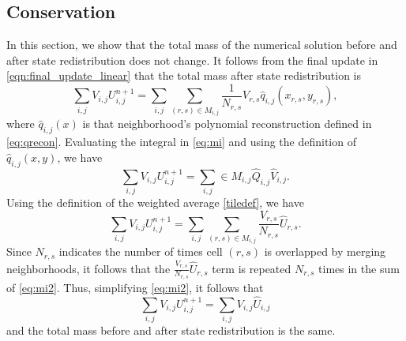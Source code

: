 \subsection{Conservation}\label{sec:cons}
In this section, we show that the total mass of the numerical solution before and after state redistribution does not change.  It follows from the final update in \eqref{eqn:final_update_linear} that the total mass after state redistribution is
\begin{equation}\label{eq:mi}
\sum_{i,j} V_{i,j} U^{n+1}_{i,j} = \sum_{i,j} \sum_{(r,s) \in
M_{i,j}}\frac{1}{N_{r,s}} V_{r,s} \widehat q_{i,j}(x_{r,s},y_{r,s}) ,
\end{equation}
where $\widehat q_{i,j}(x)$ is that neighborhood's polynomial reconstruction defined in \eqref{eq:qrecon}.
Evaluating the integral in \eqref{eq:mi} and using the definition
of $\widehat{q}_{i,j}(x,y)$, we have
\begin{equation}\label{eq:mi1}
\sum_{i,j} V_{i,j} U^{n+1}_{i,j} = \sum_{i,j} \in M_{i,j} \widehat {Q}_{i,j} 
\widehat {V}_{i,j}.
\end{equation}
Using the definition of the weighted average \eqref{tiledef}, we have
\begin{equation}\label{eq:mi2}
\sum_{i,j} V_{i,j} U^{n+1}_{i,j} = \sum_{i,j} \sum_{(r,s) \in M_{i,j} }\frac{V_{r,s}}{N_{r,s}} \widehat U_{r,s}.
\end{equation}
Since $N_{r,s}$ indicates the number of times cell $(r,s)$ is overlapped by merging neighborhoods, it follows that the $\frac{V_{r,s}}{N_{r,s}} \widehat U_{r,s}$ term is repeated $N_{r,s}$ times in the sum of \eqref{eq:mi2}.  Thus, simplifying \eqref{eq:mi2}, it follows that
\begin{equation} \label{eq:final}
\sum_{i,j} V_{i,j} U^{n+1}_{i,j} = \sum_{i,j} V_{i,j} \widehat U_{i,j}
\end{equation}
and the total mass before and after state redistribution is the same.
